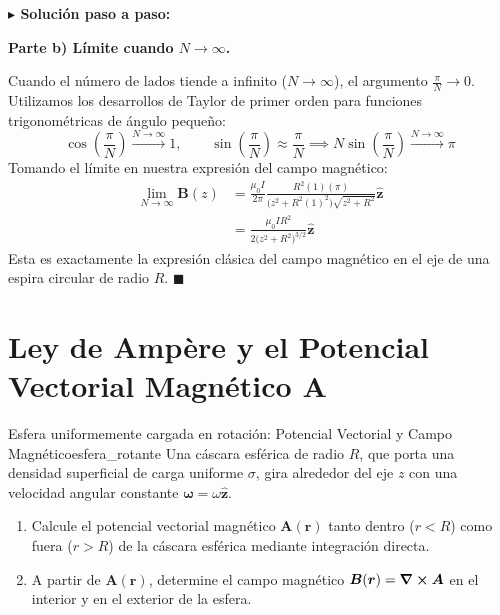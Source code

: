 \documentclass[11pt,a4paper]{book}
\newenvironment{solucion}{%
    \par\medskip\noindent\textbf{\color{blue!65!black}\Large $\blacktriangleright$ Solución paso a paso:}\par\medskip
}{%
    \hfill$\blacksquare$\par\bigskip
}
\newcommand{\zhat}{\hat{\bm{z}}}
\newcommand{\Bvec}{\bm{B}}
\newcommand{\Avec}{\bm{A}}
\begin{document}
\begin{solucion}
\medskip
\textbf{Parte b) Límite cuando $N \to \infty$.}

Cuando el número de lados tiende a infinito ($N \to \infty$), el argumento $\frac{\pi}{N} \to 0$. Utilizamos los desarrollos de Taylor de primer orden para funciones trigonométricas de ángulo pequeño:
\begin{equation}
    \cos\left(\frac{\pi}{N}\right) \xrightarrow{N\to\infty} 1, \qquad \sin\left(\frac{\pi}{N}\right) \approx \frac{\pi}{N} \implies N \sin\left(\frac{\pi}{N}\right) \xrightarrow{N\to\infty} \pi
\end{equation}
Tomando el límite en nuestra expresión del campo magnético:
\begin{align}
    \lim_{N\to\infty} \Bvec(z) &= \frac{\mu_0 I}{2\pi} \frac{R^2 (1) (\pi)}{\big(z^2 + R^2(1)^2\big)\sqrt{z^2 + R^2}} \zhat \nonumber \\
    &= \frac{\mu_0 I R^2}{2\big(z^2 + R^2\big)^{3/2}} \zhat
\end{align}
Esta es exactamente la expresión clásica del campo magnético en el eje de una espira circular de radio $R$.
\end{solucion}

\section[Ley de Ampère y potencial vectorial]{Ley de Ampère y el Potencial Vectorial Magnético \texorpdfstring{$\Avec$}{A}}

\begin{ejercicio}{Esfera uniformemente cargada en rotación: Potencial Vectorial y Campo Magnético}{esfera_rotante}
Una cáscara esférica de radio $R$, que porta una densidad superficial de carga uniforme $\sigma$, gira alrededor del eje $z$ con una velocidad angular constante $\bm{\omega} = \omega\zhat$. 
\begin{enumerate}[label=\alph*)]
    \item Calcule el potencial vectorial magnético $\Avec(\bm{r})$ tanto dentro ($r < R$) como fuera ($r > R$) de la cáscara esférica mediante integración directa.
    \item A partir de $\Avec(\bm{r})$, determine el campo magnético $\Bvec(\bm{r}) = \curl{\Avec}$ en el interior y en el exterior de la esfera.
\end{enumerate}
\end{ejercicio}
\end{document}
